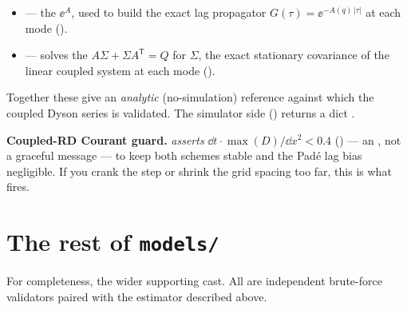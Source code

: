 \begin{itemize}
  \item {} --- the  $\ee^{A}$,
        used to build the exact lag propagator $G(\tau) = \ee^{-A(q)\,|\tau|}$ at
        each mode ().
  \item {} --- solves the
         $A\Sigma + \Sigma A^{\mathsf T} = Q$ for
        $\Sigma$, the exact stationary covariance of the linear coupled system at
        each mode ().
\end{itemize}

Together these give an \emph{analytic} (no-simulation) reference against which the
coupled Dyson series is validated. The simulator side
() returns a dict
.

\begin{gotcha}
\textbf{Coupled-RD Courant guard.}  \emph{asserts}
$\dd t\cdot\max(D)/\dd x^{2} < 0.4$ () --- an
, not a graceful message --- to keep both schemes stable and
the Pad\'e lag bias negligible. If you crank the step or shrink the grid spacing
too far, this is what fires.
\end{gotcha}

\section{The rest of \texttt{models/}}

For completeness, the wider supporting cast. All are independent brute-force
validators paired with the estimator described above.

